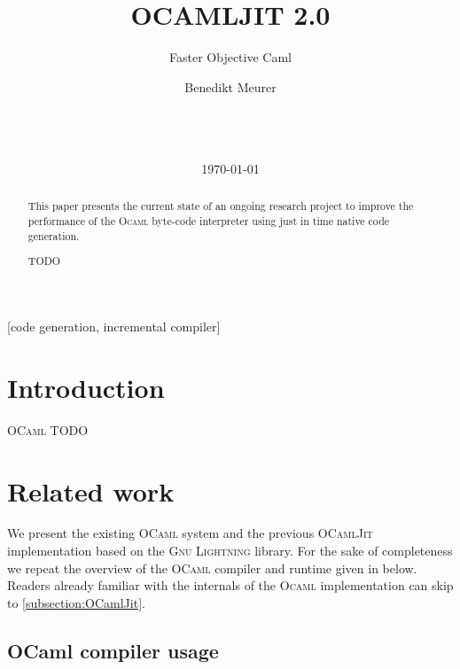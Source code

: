 \documentclass[a4paper]{acm_proc_article-sp}
\begin{document}
\title{OCAMLJIT 2.0}
\subtitle{Faster Objective Caml}

\author{
\alignauthor
Benedikt Meurer\\
\\
\\
\\
}

\date{\today}

\maketitle

\begin{abstract}
  This paper presents the current state of an ongoing research
  project to improve the performance of the \textsc{Ocaml}
  byte-code interpreter using just in time native code generation.

  TODO
\end{abstract}

[code generation, incremental compiler]




\section{Introduction}

\textsc{OCaml}\cite{Leroy10} TODO


\section{Related work}

We present the existing \textsc{OCaml} system and the previous \textsc{OCamlJit}\cite{Starynkevitch04}
implementation based on the \textsc{Gnu Lightning} library\cite{Bonzini10}. For the sake of completeness
we repeat the overview of the \textsc{OCaml} compiler and runtime given in \cite{Starynkevitch04} below.
Readers already familiar with the internals of the \textsc{Ocaml} implementation can skip to
\ref{subsection:OCamlJit}.

\subsection{OCaml compiler usage}
\end{document}
